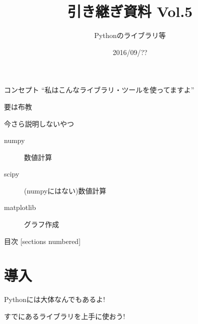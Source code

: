 \documentclass[12pt, xetex, xcolor=pdftex, dvipsnames]{beamer}
\title{引き継ぎ資料 Vol.5}
\subtitle{Pythonのライブラリ等}
\date{2016/09/??}
\author{}
\institute{}
\begin{document}
\maketitle
\begin{frame}{コンセプト}
    ``私はこんなライブラリ・ツールを使ってますよ''

    要は布教
\end{frame}
\begin{frame}{今さら説明しないやつ}
    \begin{description}
        \item[numpy] 数値計算
        \item[scipy] (numpyにはない)数値計算
        \item[matplotlib] グラフ作成
    \end{description}
\end{frame}
\begin{frame}{目次}
  [sections numbered]
  \tableofcontents[hideallsubsections]
\end{frame}
\section{導入}
\begin{frame}
    Pythonには大体なんでもあるよ!
\end{frame}
\begin{frame}
    すでにあるライブラリを上手に使おう!
\end{frame}
\end{document}
